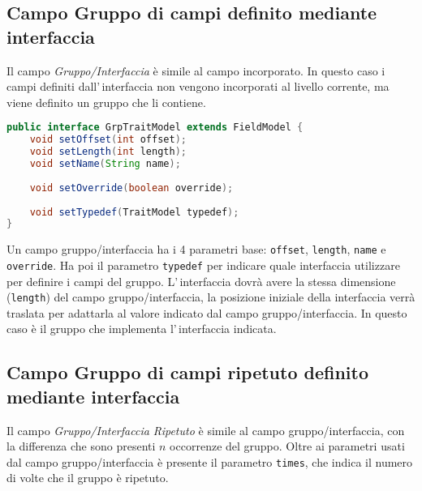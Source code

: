 \documentclass[a4paper,10pt]{report}
\begin{document}
\subsection{Campo Gruppo di campi definito mediante interfaccia} 
Il campo \textsl{Gruppo/Interfaccia} è simile al campo incorporato.
In questo caso i campi definiti dall'\,interfaccia non vengono incorporati al
livello corrente, ma viene definito un gruppo che li contiene.

\begin{figure*}[!htb]
\begin{lstlisting}[language=java, 
caption=interfaccia GrpTraitModel (campo gruppo/interfaccia), 
label=lst:GrpTraitModel]
public interface GrpTraitModel extends FieldModel {
    void setOffset(int offset);
    void setLength(int length);
    void setName(String name);
    
    void setOverride(boolean override);
    
    void setTypedef(TraitModel typedef);
}
\end{lstlisting}
\end{figure*}

Un campo gruppo/interfaccia ha i 4 parametri base: \verb!offset!, \verb!length!, 
\verb!name! e \verb!override!.
Ha poi il parametro \verb!typedef! per indicare quale interfaccia utilizzare per
definire i campi del gruppo. L'\,interfaccia dovrà avere la stessa dimensione 
(\verb!length!) del campo gruppo/interfaccia, la posizione iniziale della 
interfaccia verrà traslata per adattarla al valore indicato dal campo 
gruppo/interfaccia.
In questo caso è il gruppo che implementa l'\,interfaccia indicata.


\subsection{Campo Gruppo di campi ripetuto definito mediante interfaccia}
Il campo \textsl{Gruppo/Interfaccia Ripetuto} è simile al campo 
gruppo/interfaccia, con la differenza che sono presenti $n$ occorrenze del 
gruppo. Oltre ai parametri usati dal campo gruppo/interfaccia è presente il 
parametro \verb!times!, che indica il numero di volte che il gruppo è ripetuto.
\end{document}
